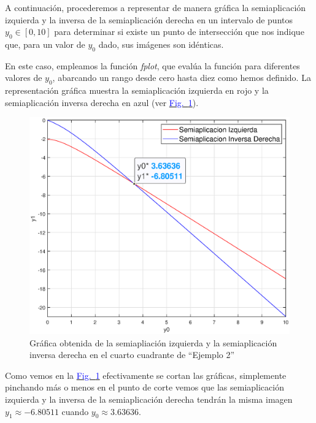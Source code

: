 \documentclass[12pt,a4paper]{report} %
\newcommand{\fref}[1]{\hyperref[#1]{\textcolor{blue}{Fig.~\ref*{#1}}}}
\begin{document}
 	A continuación, procederemos a representar de manera gráfica la semiaplicación izquierda y la inversa de la semiaplicación derecha en un intervalo de puntos $y_0 \in [0, 10]$ para determinar si existe un punto de intersección que nos indique que, para un valor de $y_0$ dado, sus imágenes son idénticas.
	
	\vspace{1cm}
	
	\vspace{1cm}En este caso, empleamos la función \textit{fplot}, que evalúa la función para diferentes valores de $y_0$, abarcando un rango desde cero hasta diez como hemos definido. La representación gráfica muestra la semiaplicación izquierda en rojo y la semiaplicación inversa derecha en azul (ver \fref{fig:ejem2_2}).
	\newpage
	
	\begin{figure}[h]
		\centering
		\includegraphics[width=1\textwidth]{g1ejem2.eps}
		\caption{Gráfica obtenida de la semiapliación izquierda y la semiaplicación inversa derecha en el cuarto cuadrante de ``Ejemplo 2''}
		\label{fig:ejem2_2}
	\end{figure}\smallskip
	
	Como vemos en la \fref{fig:ejem2_2} efectivamente se cortan las gráficas, simplemente pinchando más o menos en el punto de corte vemos que las semiaplicación izquierda y la inversa de la semiaplicación derecha tendrán la misma imagen $y_1\approx-6.80511$ cuando $y_0\approx3.63636$.
	\newpage
	
\end{document}
